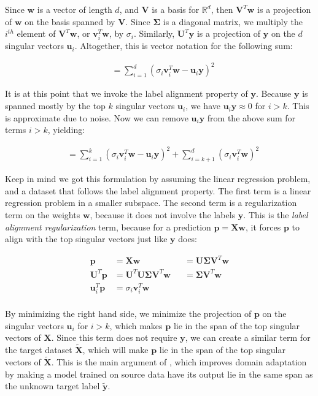 \documentclass[twoside,11pt]{article}
\begin{document}
Since $\mathbf{w}$ is a vector of length $d$, and $\mathbf{V}$ is a basis for $\mathbb{R}^d$, then $\mathbf{V}^T \mathbf{w}$ is a projection of $\mathbf{w}$ on the basis spanned by $\mathbf{V}$. Since $\mathbf{\Sigma}$ is a diagonal matrix, we multiply the $i^{th}$ element of $\mathbf{V}^T \mathbf{w}$, or $\mathbf{v}_i^T \mathbf{w}$, by $\sigma_i$. Similarly, $\mathbf{U}^T \mathbf{y}$ is a projection of $\mathbf{y}$ on the $d$ singular vectors $\mathbf{u}_i$. Altogether, this is vector notation for the following sum:

$$
\begin{aligned}
&= \sum_{i=1}^d (\sigma_i \mathbf{v}_i^T \mathbf{w} - \mathbf{u}_i \mathbf{y})^2
\end{aligned}
$$

It is at this point that we invoke the label alignment property of $\mathbf{y}$. Because $\mathbf{y}$ is spanned mostly by the top $k$ singular vectors $\mathbf{u}_i$, we have $\mathbf{u}_i \mathbf{y} \approx 0$ for $i>k$. This is approximate due to noise. Now we can remove $\mathbf{u}_i \mathbf{y}$ from the above sum for terms $i>k$, yielding: 

$$
\begin{aligned}
&= \sum_{i=1}^k (\sigma_i \mathbf{v}_i^T \mathbf{w} - \mathbf{u}_i \mathbf{y})^2 + \sum_{i=k+1}^d (\sigma_i \mathbf{v}_i^T \mathbf{w} )^2
\end{aligned}
$$

Keep in mind we got this formulation by assuming the linear regression problem, and a dataset that follows the label alignment property. The first term is a linear regression problem in a smaller subspace. The second term is a regularization term on the weights $\mathbf{w}$, because it does not involve the labels $\mathbf{y}$. This is the \emph{label alignment regularization} term, because for a prediction $\mathbf{p} = \mathbf{X w}$, it forces $\mathbf{p}$ to align with the top singular vectors just like $\mathbf{y}$ does:

$$
\begin{aligned}
\mathbf{p} &= \mathbf{X w} &&= \mathbf{U \Sigma V}^T \mathbf{w} \\
\mathbf{U}^T \mathbf{p} &= \mathbf{U}^T \mathbf{U \Sigma V}^T \mathbf{w} &&= \mathbf{\Sigma V}^T \mathbf{w}\\
\mathbf{u}_i^T \mathbf{p} &= \sigma_i \mathbf{v}_i^T \mathbf{w}\\
\end{aligned}
$$

By minimizing the right hand side, we minimize the projection of $\mathbf{p}$ on the singular vectors $\mathbf{u}_i$ for $i>k$, which makes $\mathbf{p}$ lie in the span of the top singular vectors of $\mathbf{X}$. Since this term does not require $\mathbf{y}$, we can create a similar term for the target dataset $\mathbf{\tilde{X}}$, which will make $\mathbf{p}$ lie in the span of the top singular vectors of $\mathbf{\tilde{X}}$. This is the main argument of \cite{imani2022label}, which improves domain adaptation by making a model trained on source data have its output lie in the same span as the unknown target label $\mathbf{\tilde{y}}$.
\end{document}

